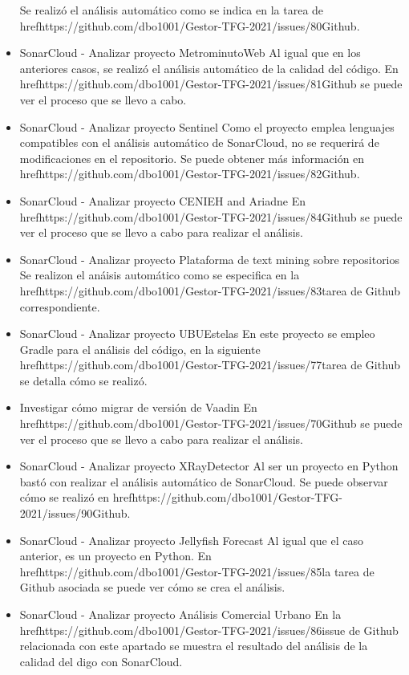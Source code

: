 \begin{itemize}
		Se realizó el análisis automático como se indica en la tarea de href{https://github.com/dbo1001/Gestor-TFG-2021/issues/80}{Github}.
	\item SonarCloud - Analizar proyecto MetrominutoWeb	
		Al igual que en los anteriores casos, se realizó el análisis automático de la calidad del código. En href{https://github.com/dbo1001/Gestor-TFG-2021/issues/81}{Github} se puede ver el proceso que se llevo a cabo.
	\item SonarCloud - Analizar proyecto Sentinel
		Como el proyecto emplea lenguajes compatibles con el análisis automático de SonarCloud, no se requerirá de modificaciones en el repositorio. Se puede obtener más información en href{https://github.com/dbo1001/Gestor-TFG-2021/issues/82}{Github}.
	\item SonarCloud - Analizar proyecto CENIEH and Ariadne
		En href{https://github.com/dbo1001/Gestor-TFG-2021/issues/84}{Github} se puede ver el proceso que se llevo a cabo para realizar el análisis.
	\item SonarCloud - Analizar proyecto Plataforma de text mining sobre repositorios
		Se realizon el anáisis automático como se especifica en la href{https://github.com/dbo1001/Gestor-TFG-2021/issues/83}{tarea de Github correspondiente}.
	\item SonarCloud - Analizar proyecto UBUEstelas 	
		En este proyecto se empleo Gradle para el análisis del código, en la siguiente href{https://github.com/dbo1001/Gestor-TFG-2021/issues/77}{tarea de Github} se detalla cómo se realizó.
	\item Investigar cómo migrar de versión de Vaadin 
		En href{https://github.com/dbo1001/Gestor-TFG-2021/issues/70}{Github} se puede ver el proceso que se llevo a cabo para realizar el análisis.
	\item SonarCloud - Analizar proyecto XRayDetector
		Al ser un proyecto en Python bastó con realizar el análisis automático de SonarCloud. Se puede observar cómo se realizó en href{https://github.com/dbo1001/Gestor-TFG-2021/issues/90}{Github}.
	\item SonarCloud - Analizar proyecto Jellyfish Forecast
		Al igual que el caso anterior, es un proyecto en Python. En href{https://github.com/dbo1001/Gestor-TFG-2021/issues/85}{la tarea de Github} asociada se puede ver cómo se crea el análisis.
	\item SonarCloud - Analizar proyecto Análisis Comercial Urbano
		En la href{https://github.com/dbo1001/Gestor-TFG-2021/issues/86}{issue de Github} relacionada con este apartado se muestra el resultado del análisis de la calidad del digo con SonarCloud.

\end{itemize}
